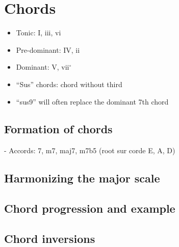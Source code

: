 \documentclass{article}
\begin{document}
\section{Chords}

\begin{itemize}
	\item Tonic: I, iii, vi
	\item Pre-dominant: IV, ii
	\item Dominant: V, vii$^\circ$
\end{itemize}


\begin{itemize}
	\item ``Sus'' chords: chord without third
	\item ``sus9'' will often replace the dominant 7th chord
\end{itemize}

\newpage
\subsection{Formation of chords}



- Accords: 7, m7, maj7, m7b5 (root sur corde E, A, D)

\newpage
\subsection{Harmonizing the major scale}




\newpage
\subsection{Chord progression and example}



\newpage
\subsection{Chord inversions}
\end{document}
